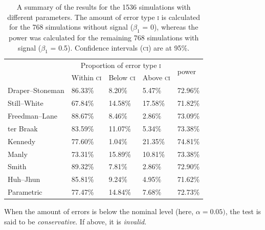 \begin{table}[!tp]
\caption[Summary of the amount of error type \textsc{i} and power for the different permutation strategies.]{A summary of the results for the 1536 simulations with different parameters. The amount of error type \textsc{i} is calculated for the 768 simulations without signal ($\beta_1$ = 0), whereas the power was calculated for the remaining 768 simulations with signal ($\beta_1$ = 0.5). Confidence intervals (\textsc{ci}) are at 95\%.}
\begin{center}
{\small
\begin{tabular}{@{}m{37mm}<{\raggedright}m{18mm}<{\centering}m{18mm}<{\centering}m{18mm}<{\centering}m{18mm}<{\centering}@{}}
\toprule
\multirow{2}{*}{\raisebox{-3pt}{Method}} &   \multicolumn{3}{c}{Proportion of error type \textsc{i}} & \multirow{2}{19mm}{\raisebox{-3pt}{Average} power}\\
\cmidrule(lr){2-4}
                        & Within \textsc{ci} & Below \textsc{ci} & Above \textsc{ci}\\
\midrule
Draper--Stoneman & 86.33\% &  8.20\% &  5.47\% & 72.96\%\\
Still--White     & 67.84\% & 14.58\% & 17.58\% & 71.82\%\\
Freedman--Lane   & 88.67\% &  8.46\% &  2.86\% & 73.09\%\\
ter Braak        & 83.59\% & 11.07\% &  5.34\% & 73.38\%\\
Kennedy          & 77.60\% &  1.04\% & 21.35\% & 74.81\%\\
Manly            & 73.31\% & 15.89\% & 10.81\% & 73.38\%\\
Smith            & 89.32\% &  7.81\% &  2.86\% & 72.90\%\\
Huh--Jhun        & 85.81\% &  9.24\% &  4.95\% & 71.62\%\\
Parametric       & 77.47\% & 14.84\% &  7.68\% & 72.73\%\\
\bottomrule
\end{tabular}}
\end{center}
{\footnotesize
When the amount of errors is below the nominal level (here, $\alpha=0.05)$, the test is said to be \emph{conservative}. If above, it is \emph{invalid}.\par}
\label{tab:perm:summary}
\end{table}

